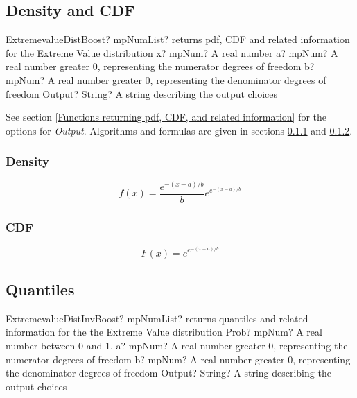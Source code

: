 \subsection{Density and CDF}

\begin{mpFunctionsExtract}
	\mpFunctionFour
	{ExtremevalueDistBoost? mpNumList? returns pdf, CDF and related information for the Extreme Value distribution}
	{x? mpNum? A real number}
	{a? mpNum? A real number greater 0, representing the numerator  degrees of freedom}
	{b? mpNum? A real number greater 0, representing the denominator degrees of freedom}
	{Output? String? A string describing the output choices}
\end{mpFunctionsExtract}


\vspace{0.3cm}
See section \ref{Functions returning pdf, CDF, and related information} for the options for {\itshape\sffamily Output}. Algorithms and formulas are given in sections \ref{ExtremevalueDistributionDensity} and \ref{ExtremevalueDistributionCDF}.


\subsubsection{Density}
\label{ExtremevalueDistributionDensity}

\begin{equation} 
	f(x)=\frac{e^{-(x-a)/b}}{b} e^{e^{-(x-a)/b}}
\end{equation}


\subsubsection{CDF}
\label{ExtremevalueDistributionCDF}
\begin{equation} 
	F(x)= e^{e^{-(x-a)/b}}
\end{equation}



\subsection{Quantiles}
\begin{mpFunctionsExtract}
	\mpFunctionFour
	{ExtremevalueDistInvBoost? mpNumList? returns quantiles and related information for the the Extreme Value distribution}
	{Prob? mpNum? A real number between 0 and 1.}
	{a? mpNum? A real number greater 0, representing the numerator  degrees of freedom}
	{b? mpNum? A real number greater 0, representing the denominator degrees of freedom}
	{Output? String? A string describing the output choices}
\end{mpFunctionsExtract}

